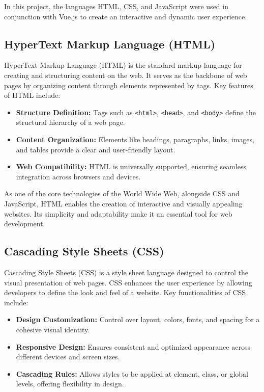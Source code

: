 In this project, the languages HTML, CSS, and JavaScript were used in conjunction with Vue.js to create an interactive and dynamic user experience.

\subsection{HyperText Markup Language (HTML)}

HyperText Markup Language (HTML) is the standard markup language for creating and structuring content on the web. It serves as the backbone of web pages by organizing content through elements represented by tags. Key features of HTML include:

\begin{itemize}
    \item \textbf{Structure Definition:} Tags such as \texttt{<html>}, \texttt{<head>}, and \texttt{<body>} define the structural hierarchy of a web page.
    \item \textbf{Content Organization:} Elements like headings, paragraphs, links, images, and tables provide a clear and user-friendly layout.
    \item \textbf{Web Compatibility:} HTML is universally supported, ensuring seamless integration across browsers and devices.
\end{itemize}

As one of the core technologies of the World Wide Web, alongside CSS and JavaScript, HTML enables the creation of interactive and visually appealing websites. Its simplicity and adaptability make it an essential tool for web development.

\cite{HTML-Wikipedia}

\subsection{Cascading Style Sheets (CSS)}

Cascading Style Sheets (CSS) is a style sheet language designed to control the visual presentation of web pages. CSS enhances the user experience by allowing developers to define the look and feel of a website. Key functionalities of CSS include:

\begin{itemize}
    \item \textbf{Design Customization:} Control over layout, colors, fonts, and spacing for a cohesive visual identity.
    \item \textbf{Responsive Design:} Ensures consistent and optimized appearance across different devices and screen sizes.
    \item \textbf{Cascading Rules:} Allows styles to be applied at element, class, or global levels, offering flexibility in design.
\end{itemize}

